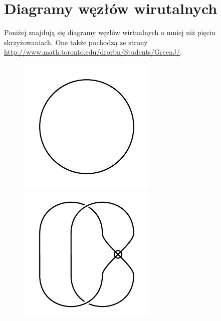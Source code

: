 \section{Diagramy węzłów wirutalnych}
Poniżej znajdują się diagramy węzłów wirtualnych o mniej niż pięciu skrzyżowaniach.
One także pochodzą ze strony \url{http://www.math.toronto.edu/drorbn/Students/GreenJ/}.

\begin{figure}[H]
\begin{minipage}[b]{.18\linewidth}
\centering
\includegraphics[width=\linewidth]{../data/virtual_0_1.png}
\end{minipage}
\begin{minipage}[b]{.18\linewidth}
\centering
\includegraphics[width=\linewidth]{../data/virtual_2_1.png}

\end{minipage}
\end{figure}
